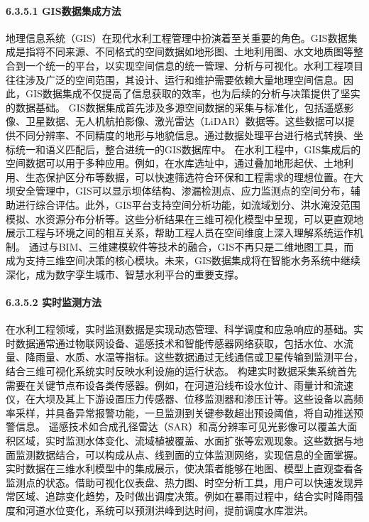 \paragraph{6.3.5.1 GIS数据集成方法}\label{gisux6570ux636eux96c6ux6210ux65b9ux6cd5}
地理信息系统（GIS）在现代水利工程管理中扮演着至关重要的角色。GIS数据集成是指将不同来源、不同格式的空间数据如地形图、土地利用图、水文地质图等整合到一个统一的平台，以实现空间信息的统一管理、分析与可视化。水利工程项目往往涉及广泛的空间范围，其设计、运行和维护需要依赖大量地理空间信息。因此，GIS数据集成不仅提高了信息获取的效率，也为后续的分析与决策提供了坚实的数据基础。
GIS数据集成首先涉及多源空间数据的采集与标准化，包括遥感影像、卫星数据、无人机航拍影像、激光雷达（LiDAR）数据等。这些数据可以提供不同分辨率、不同精度的地形与地貌信息。通过数据处理平台进行格式转换、坐标统一和语义匹配后，整合进统一的GIS数据库中。
在水利工程中，GIS集成后的空间数据可以用于多种应用。例如，在水库选址中，通过叠加地形起伏、土地利用、生态保护区分布等数据，可以快速筛选符合环保和工程需求的理想位置。在大坝安全管理中，GIS可以显示坝体结构、渗漏检测点、应力监测点的空间分布，辅助进行综合评估。此外，GIS平台支持空间分析功能，如流域划分、洪水淹没范围模拟、水资源分布分析等。这些分析结果在三维可视化模型中呈现，可以更直观地展示工程与环境之间的相互关系，帮助工程人员在空间维度上深入理解系统运作机制。
通过与BIM、三维建模软件等技术的融合，GIS不再只是二维地图工具，而成为支持三维空间决策的核心模块。未来，GIS数据集成将在智能水务系统中继续深化，成为数字孪生城市、智慧水利平台的重要支撑。 \paragraph{6.3.5.2
实时监测方法}\label{ux5b9eux65f6ux76d1ux6d4bux65b9ux6cd5}
在水利工程领域，实时监测数据是实现动态管理、科学调度和应急响应的基础。实时数据通常通过物联网设备、遥感技术和智能传感器网络获取，包括水位、水流量、降雨量、水质、水温等指标。这些数据通过无线通信或卫星传输到监测平台，结合三维可视化系统实时反映水利设施的运行状态。
构建实时数据采集系统首先需要在关键节点布设各类传感器。例如，在河道沿线布设水位计、雨量计和流速仪，在大坝及其上下游设置压力传感器、位移监测器和渗压计等。这些设备以高频率采样，并具备异常报警功能，一旦监测到关键参数超出预设阈值，将自动推送预警信息。
遥感技术如合成孔径雷达（SAR）和高分辨率可见光影像可以覆盖大面积区域，实时监测水体变化、流域植被覆盖、水面扩张等宏观现象。这些数据与地面监测数据结合，可以构成从点、线到面的立体监测网络，实现信息的全面掌握。实时数据在三维水利模型中的集成展示，使决策者能够在地图、模型上直观查看各监测点的状态。借助可视化仪表盘、热力图、时空分析工具，用户可以快速发现异常区域、追踪变化趋势，及时做出调度决策。例如在暴雨过程中，结合实时降雨强度和河道水位变化，系统可以预测洪峰到达时间，提前调度水库泄洪。
